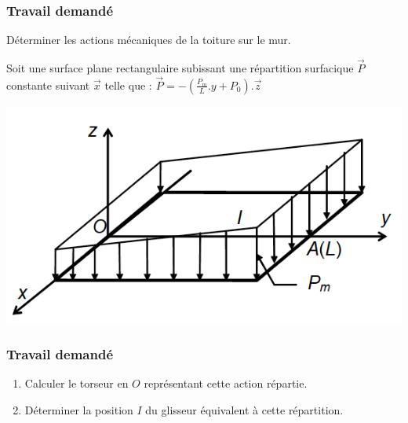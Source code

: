 \subsubsection{Travail demandé}
Déterminer les actions mécaniques de la toiture sur le mur.

\newpage



Soit une surface plane rectangulaire subissant une répartition surfacique $\overrightarrow{P}$ constante suivant $\overrightarrow{x}$ telle que : $\overrightarrow{P}=-(\frac{P_m}{L}.y+P_0).\overrightarrow{z}$

\begin{center}
\includegraphics[scale=0.5]{png/dalle.png}
\end{center}

\subsubsection{Travail demandé}
\begin{enumerate}
\item Calculer le torseur en $O$ représentant cette action répartie.
\item Déterminer la position $I$ du glisseur équivalent à cette répartition.
\end{enumerate}

